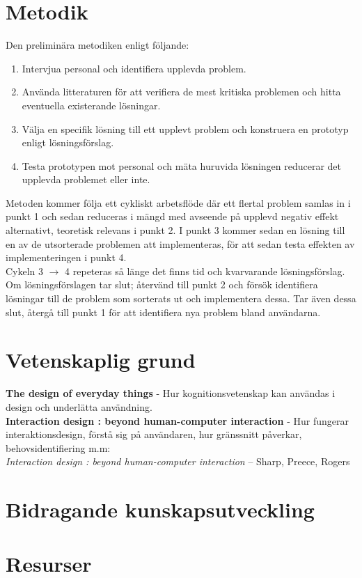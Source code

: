 \documentclass{article}
\begin{document}
\section*{Metodik}

  Den preliminära metodiken enligt följande:
  \begin{enumerate}
    \item{Intervjua personal och identifiera upplevda problem.}
    \item{Använda litteraturen för att verifiera de mest kritiska problemen och
        hitta eventuella existerande lösningar.}
    \item{Välja en specifik lösning till ett upplevt problem och konstruera en
        prototyp enligt lösningsförslag.}
    \item{Testa prototypen mot personal och mäta huruvida lösningen reducerar
        det upplevda problemet eller inte.}
  \end{enumerate}

  Metoden kommer följa ett cykliskt arbetsflöde där ett flertal problem samlas
  in i punkt 1 och sedan reduceras i mängd med avseende på upplevd negativ
  effekt alternativt, teoretisk relevans i punkt 2. I punkt 3 kommer sedan en
  lösning till en av de utsorterade problemen att implementeras, för att sedan
  testa effekten av implementeringen i punkt 4. \\

  Cykeln 3 $\rightarrow$ 4 repeteras så länge det finns tid och kvarvarande
  lösningsförslag. Om lösningsförslagen tar slut; återvänd till punkt 2 och
  försök identifiera lösningar till de problem som sorterats ut och
  implementera dessa. Tar även dessa slut, återgå till punkt 1 för att
  identifiera nya problem bland användarna.

\section*{Vetenskaplig grund}

  \textbf{The design of everyday things}\cite{c_design_norman} -
  Hur kognitionsvetenskap kan användas i design och underlätta användning. \\

  \textbf{Interaction design : beyond human-computer
    interaction}\cite{c_interaction_design} -
  Hur fungerar interaktionsdesign, förstå sig på användaren, hur gränssnitt
  påverkar, behovsidentifiering m.m: \\
  \textit{Interaction design : beyond human-computer interaction } -- Sharp,
  Preece, Rogers\cite{interaction_design}

\section*{Bidragande kunskapsutveckling}

\section*{Resurser}



\end{document}
